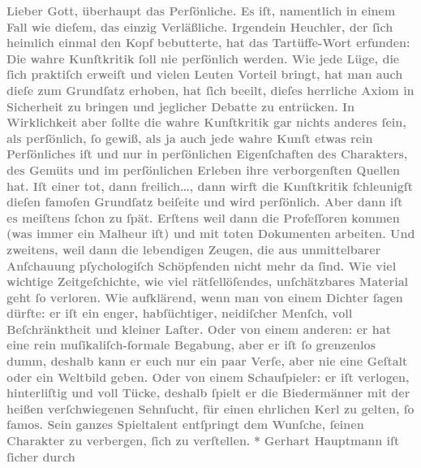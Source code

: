 \begin{ledgroupsized}[t]{13cm}
           \pstart
           \noindent{}\textcolor{gray}{\textbf{Lieber Gott, überhaupt das Perſönliche. Es iſt, namentlich in
                  einem Fall wie dieſem, das einzig Verläßliche. Irgendein Heuchler, der ſich
                  heimlich einmal den Kopf bebutterte, hat das Tartüffe-Wort erfunden: Die wahre Kunſtkritik ſoll nie
                  perſönlich werden. Wie jede Lüge, die ſich praktiſch erweiſt und vielen Leuten
                  Vorteil bringt, hat man auch dieſe zum Grundſatz erhoben, hat ſich beeilt, dieſes
                  herrliche Axiom in Sicherheit zu bringen und jeglicher Debatte zu entrücken. In
                  Wirklichkeit aber ſollte die wahre Kunſtkritik gar nichts anderes ſein, als
                  perſönlich, ſo gewiß, als ja auch jede wahre Kunſt etwas rein Perſönliches iſt und
                  nur in perſönlichen Eigenſchaften des Charakters, des Gemüts und im perſönlichen
                  Erleben ihre verborgenſten Quellen hat. Iſt einer tot, dann freilich{\dots}, dann wirft die Kunſtkritik ſchleunigſt dieſen
                  famoſen Grundſatz beiſeite und wird perſönlich. Aber dann iſt es meiſtens ſchon zu
                  ſpät. Erſtens weil dann die Profeſſoren kommen (was immer ein Malheur iſt) und mit
                  toten Dokumenten arbeiten. Und zweitens, weil dann die lebendigen Zeugen, die aus
                  unmittelbarer Anſchauung pſychologiſch Schöpfenden nicht mehr da ſind. Wie viel
                  wichtige Zeitgeſchichte, wie viel rätſellöſendes, unſchätzbares Material geht ſo
                  verloren. Wie aufklärend, wenn man von einem Dichter ſagen dürfte: er iſt ein
                  enger, habſüchtiger, neidiſcher Menſch, voll Beſchränktheit und kleiner Laſter.
                  Oder von einem anderen: er hat eine rein muſikaliſch-formale Begabung, aber er iſt
                  ſo grenzenlos dumm, deshalb kann er euch nur ein paar Verſe, aber nie eine Geſtalt
                  oder ein Weltbild geben. Oder von einem Schauſpieler: er iſt verlogen,
                  hinterliſtig und voll Tücke, deshalb ſpielt er die Biedermänner mit der heißen
                  verſchwiegenen Sehnſucht, für einen ehrlichen Kerl zu gelten, ſo famos. Sein
                  ganzes Spieltalent entſpringt dem Wunſche, ſeinen Charakter zu verbergen, ſich zu
                  verſtellen.}}\pend
           \pstart
           \centering{}\textcolor{gray}{\textbf{*}}\pend
           \pstart
           \noindent{}\textcolor{gray}{\textbf{Gerhart Hauptmann iſt ſicher durch
}}
\end{ledgroupsized}
